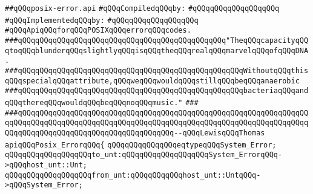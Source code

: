 \label{src/lib/std/src/psx/posix-error.api}
\verb|##qQQqposix-error.api|\newline
\newline
\verb|#qQQqCompiledqQQqby:|\newline
\verb|#qQQqqQQqqQQqqQQqqQQq|\newline
\newline
\verb|#qQQqImplementedqQQqby:|\newline
\verb|#qQQqqQQqqQQqqQQqqQQq|\newline
\newline
\newline
\newline
\verb|#qQQqApiqQQqforqQQqPOSIXqQQqerrorqQQqcodes.|\newline
\newline
\newline
\newline
\verb|###qQQqqQQqqQQqqQQqqQQqqQQqqQQqqQQqqQQqqQQqqQQqqQQq"TheqQQqcapacityqQQqtoqQQqblunderqQQqslightlyqQQqisqQQqtheqQQqrealqQQqmarvelqQQqofqQQqDNA.|\newline
\verb|###qQQqqQQqqQQqqQQqqQQqqQQqqQQqqQQqqQQqqQQqqQQqqQQqqQQqWithoutqQQqthisqQQqspecialqQQqattribute,qQQqweqQQqwouldqQQqstillqQQqbeqQQqanaerobic|\newline
\verb|###qQQqqQQqqQQqqQQqqQQqqQQqqQQqqQQqqQQqqQQqqQQqqQQqqQQqbacteriaqQQqandqQQqthereqQQqwouldqQQqbeqQQqnoqQQqmusic."|\newline
\verb|###|\newline
\verb|###qQQqqQQqqQQqqQQqqQQqqQQqqQQqqQQqqQQqqQQqqQQqqQQqqQQqqQQqqQQqqQQqqQQqqQQqqQQqqQQqqQQqqQQqqQQqqQQqqQQqqQQqqQQqqQQqqQQqqQQqqQQqqQQqqQQqqQQqqQQqqQQqqQQqqQQqqQQqqQQqqQQqqQQqqQQqqQQq--qQQqLewisqQQqThomas|\newline
\newline
\newline
\newline
\verb|apiqQQqPosix_ErrorqQQq{|\newline
\newline
\verb|qQQqqQQqqQQqqQQqeqtypeqQQqSystem_Error;|\newline
\newline
\verb|qQQqqQQqqQQqqQQqqQQqto_unt:qQQqqQQqqQQqqQQqqQQqSystem_ErrorqQQq->qQQqhost_unt::Unt;|\newline
\verb|qQQqqQQqqQQqqQQqqQQqfrom_unt:qQQqqQQqqQQqhost_unt::UntqQQq->qQQqSystem_Error;|\newline
